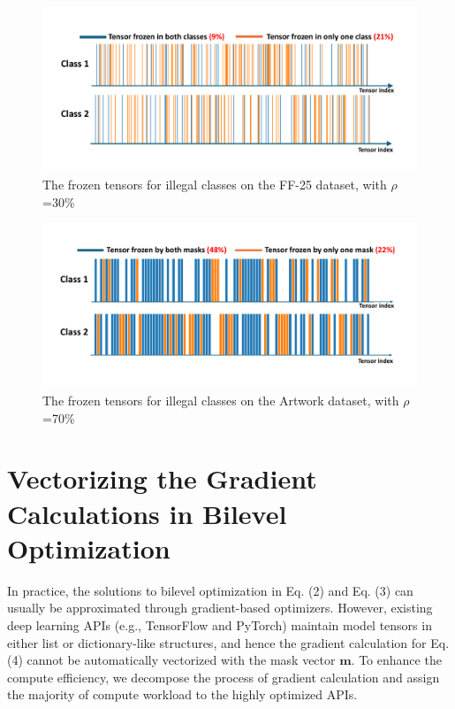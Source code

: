 \documentclass{article}
\begin{document}
\begin{figure}
	\centering
	\vspace{-0.05in}
	\includegraphics[width=0.7\linewidth]{figures/tensor_ff25.pdf}
	\caption{The frozen tensors for illegal classes on the FF-25 dataset, with $\rho$=30\%}
	\label{fig:tensor_ff25}
	\vspace{-0.05in}
\end{figure}

\begin{figure}
	\centering
	\vspace{-0.05in}
	\includegraphics[width=0.7\linewidth]{figures/tensor_art.pdf}
	\caption{The frozen tensors for illegal classes on the Artwork dataset, with $\rho$=70\%}
	\label{fig:tensor_art}
	\vspace{-0.05in}
\end{figure}





% 

\newpage
\appendix

\section{Vectorizing the Gradient Calculations in Bilevel Optimization}
\label{sec:vectorizing}
In practice, the solutions to bilevel optimization in Eq. (2) and Eq. (3) can usually be approximated through gradient-based optimizers. However, existing deep learning APIs (e.g., TensorFlow and PyTorch) maintain model tensors in either list or dictionary-like structures, and hence the gradient calculation for Eq. (4) cannot be automatically vectorized with the mask vector $\mathbf{m}$. To enhance the compute efficiency, we decompose the process of gradient calculation and assign the majority of compute workload to the highly optimized APIs. 
\end{document}

